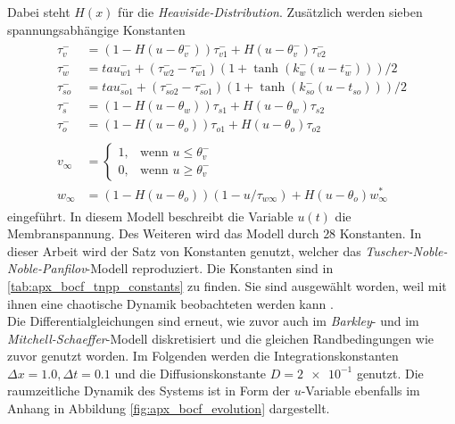 Dabei steht $H(x)$ für die \textit{Heaviside-Distribution}. Zusätzlich werden sieben spannungsabhängige Konstanten
\begin{align}
\begin{aligned}
\tau_v^-   &= (1-H(u-\theta_v^-))\tau_{v1}^- + H(u-\theta_v^-)\tau_{v2}^- \\
\tau_w^-   &= tau_{w1}^- + (\tau_{w2}^- - \tau_{w1}^-)(1+\tanh(k_w^-(u-t_w^-)))/2 \\
\tau_{so}^- &= tau_{so1}^- + (\tau_{so2}^- - \tau_{so1}^-)(1+\tanh(k_{so}^-(u-t_{so})))/2 \\
\tau_s^-    &= (1-H(u-\theta_w))\tau_{s1} + H(u-\theta_w)\tau_{s2} \\ 
\tau_o^-    &= (1-H(u-\theta_o))\tau_{o1} + H(u-\theta_o)\tau_{o2} \\\\
v_\infty &= \begin{cases}
	1,& \text{wenn } u \leq \theta_v^-\\
    0,& \text{wenn } u \geq \theta_v^-
\end{cases} \\
w_\infty &= (1-H(u-\theta_o))(1-u/\tau_{w\infty}) + H(u-\theta_o)w_\infty^*
\end{aligned}
\end{align}
eingeführt. In diesem Modell beschreibt die Variable $u(t)$ die Membranspannung. Des Weiteren wird das Modell durch $28$ Konstanten. In dieser Arbeit wird der Satz von Konstanten genutzt, welcher das \textit{Tuscher-Noble-Noble-Panfilov}-Modell reproduziert. Die Konstanten sind in \ref{tab:apx_bocf_tnpp_constants} zu finden. Sie sind ausgewählt worden, weil mit ihnen eine chaotische Dynamik beobachteten werden kann \citep{Bueno-Orovio2008}.\\

Die Differentialgleichungen sind erneut, wie zuvor auch im \textit{Barkley}- und im \textit{Mitchell-Schaeffer}-Modell diskretisiert und die gleichen Randbedingungen wie zuvor genutzt worden. Im Folgenden werden die Integrationskonstanten $\Delta x = 1.0, \Delta t = 0.1$ und die Diffusionskonstante $D = \num{2e-1}$ genutzt. Die raumzeitliche Dynamik des Systems ist in Form der $u$-Variable ebenfalls im Anhang in Abbildung \ref{fig:apx_bocf_evolution} dargestellt.\\
